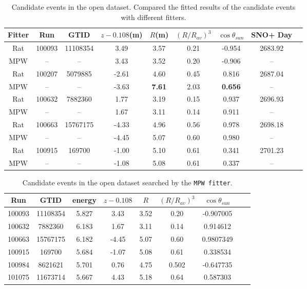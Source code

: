 \begin{table}[ht]
	\centering
	\caption[Candidate events in the open dataset.]{Candidate events in the open dataset. Compared the fitted results of the candidate events with different fitters.}
	\label{opendata}
	\begin{tabular*}{150mm}{c@{\extracolsep{\fill}}cccccccc}
		\toprule
		Fitter &	Run &  GTID &  $z-0.108$(m) & $R$(m)& $(R/R_{av})^3$ & $\cos\theta_{sun}$ & SNO+ Day\\
		\hline 
		Rat & 100093 &11108354 &3.49 &3.57 &0.21 &-0.954 &2683.92 \\	
		MPW &  --& --& 3.43 &	3.52 &	0.20	& -0.906 & --\\
		Rat &	100207 &5079885 &-2.61 &4.60 &0.45 &0.816 &2687.04\\
		MPW &	 --& --& -3.63 & \textbf{7.61} &	2.03 & \textbf{0.656} & -- \\
		Rat &100632 &7882360 &1.77 &3.19 &0.15 &0.937 &2696.93\\
		MPW &    --& --&  1.67 & 3.11 &	0.14 & 0.911 & -- \\
		Rat &100663 &15767175 &-4.33& 4.96 &0.56 &0.978 &2698.18\\
		MPW & --& -- &-4.45 &	5.07 &	0.60 &	0.980 & -- \\
		Rat &100915 &169700 &-1.00 &5.10 &0.61 &0.341 &2701.23\\
		MPW &	--& --& -1.08 &	5.08 &	0.61 &	0.337 & -- \\	
		\bottomrule
	\end{tabular*}
\end{table}

\begin{table}[ht]
	\centering
	\caption{Candidate events in the open dataset searched by the \texttt{MPW fitter}.}
	\label{opendataMPW}
	\begin{tabular*}{150mm}{c@{\extracolsep{\fill}}cccccccc}
		\toprule
		Run & GTID & energy & $z-0.108$ & $R$ & $(R/R_{av})^3$ & $\cos\theta_{sun}$\\
		\hline 
		100093 &	11108354	&5.827 & 3.43 & 3.52 & 0.20 & -0.907005\\
		100632&	7882360    &6.183& 1.67 &3.11 &0.14 &0.914612\\
		100663&	15767175   &	6.182 & -4.45 &5.07 &0.60&	0.9807349\\
		100915&	169700   &	5.684 &	-1.07 &5.08 &0.61&0.338534\\
		100984&	8621621&	5.701 & 0.76 &4.75 &0.502&-0.647735\\
		101075&	11673714&	5.667 &4.43 &5.18 &0.64& 0.587303\\
		\bottomrule
	\end{tabular*}
\end{table}

